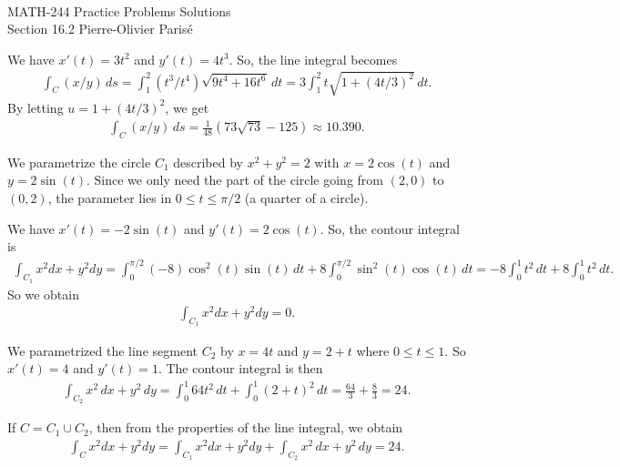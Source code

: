 


	\noindent \hrulefill \\
	MATH-244 \semester \hfill Practice Problems Solutions\\
	Section 16.2 \hfill Pierre-Olivier Paris{\'e} \\\vspace*{-1cm}
	
	\noindent\hrulefill
	
	\spc	

	We have $x'(t) = 3t^2$ and $y'(t) = 4t^3$. So, the line integral becomes
		\begin{align*}
		\int_C (x/y) \, ds = \int_1^2 (t^3/t^4) \sqrt{9t^4 + 16 t^6} \, dt = 3 \int_1^2 t \sqrt{1 + (4t/3)^2} \, dt .
		\end{align*}
	By letting $u = 1 + (4t/3)^2$, we get 
		\begin{align*}
		\int_C (x/y) \, ds = \frac{1}{48} (73 \sqrt{73} - 125) \approx 10.390 .
		\end{align*}
		
	\spc
	
	We parametrize the circle $C_1$ described by $x^2 + y^2 = 2$ with $x = 2\cos (t)$ and $y = 2\sin (t)$. Since we only need the part of the circle going from $(2, 0)$ to $(0, 2)$, the parameter lies in $0 \leq t \leq \pi/2$ (a quarter of a circle). 
	
	We have $x'(t) = -2\sin (t)$ and $y'(t) = 2\cos (t)$. So, the contour integral is
		\begin{align*}
		\int_{C_1} x^2 dx + y^2 dy = \int_0^{\pi/2} (-8) \cos^2 (t) \sin (t) \, dt + 8 \int_0^{\pi/2} \sin^2 (t) \cos (t) \, dt = -8 \int_0^1 t^2 \, dt + 8 \int_0^1 t^2 \, dt .
		\end{align*}
	So we obtain
		\begin{align*}
		\int_{C_1} x^2 dx + y^2 dy = 0 .
		\end{align*}
		
	We parametrized the line segment $C_2$ by $x = 4t$ and $y = 2 + t$ where $0 \leq t \leq 1$. So $x'(t) = 4$ and $y'(t) = 1$. The contour integral is then
		\begin{align*}
		\int_{C_2} x^2 \, dx + y^2 \, dy = \int_0^1 64 t^2 \, dt + \int_0^1 (2 + t)^2 \, dt = \frac{64}{3} + \frac{8}{3} = 24 .
		\end{align*}
		
	If $C = C_1 \cup C_2$, then from the properties of the line integral, we obtain
		\begin{align*}
		\int_{C} x^2 dx + y^2 dy = \int_{C_1} x^2 dx + y^2 dy + \int_{C_2} x^2 \, dx + y^2 \, dy = 24 .
		\end{align*}				 

